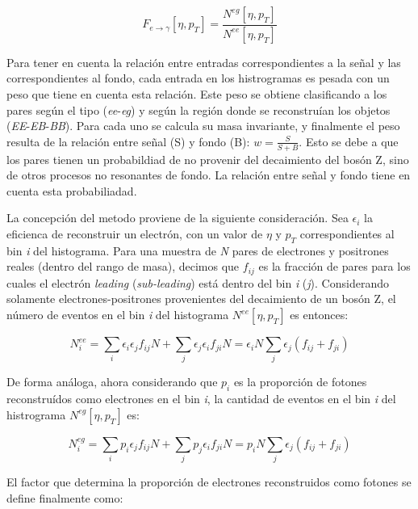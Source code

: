 \begin{equation}
F_{e\rightarrow\gamma}[\eta , p_{T}]=\frac{N^{eg}[\eta , p_{T}]}{N^{ee}[\eta , p_{T}]}
\end{equation}

Para tener en cuenta la relación entre entradas correspondientes a la señal y las correspondientes al fondo, cada entrada en los histrogramas es pesada con un peso que tiene en cuenta esta relación. Este peso se obtiene clasificando a los pares según el tipo (\textit{ee}-\textit{eg}) y según la región donde se reconstruían los objetos (\textit{EE}-\textit{EB}-\textit{BB}). Para cada uno se calcula su masa invariante, y finalmente el peso resulta de la relación entre señal (S) y fondo (B): $w=\frac{S}{S+B}$. Esto se debe a que los pares tienen un probabildiad de no provenir del decaimiento del bosón Z, sino de otros procesos no resonantes de fondo. La relación entre señal y fondo tiene en cuenta esta probabiliadad.

La concepción del metodo proviene de la siguiente consideración. Sea $\epsilon_{i}$ la eficienca de reconstruir un electrón, con un valor de $\eta$ y $p_{T}$ correspondientes al bin \textit{i} del histograma. Para una muestra de \textit{N} pares de electrones y positrones reales (dentro del rango de masa), decimos que $f_{ij}$ es la fracción de pares para los cuales el electrón \textit{leading} (\textit{sub-leading}) está dentro del bin \textit{i} (\textit{j}). Considerando solamente electrones-positrones provenientes del decaimiento de un bosón Z, el número de eventos en el bin \textit{i} del histograma $N^{ee}[\eta , p_{T}]$ es entonces:

\begin{equation}
N_{i}^{ee} = \sum_{i}\epsilon_{i}\epsilon_{j}f_{ij}N + \sum_{j}\epsilon_{j}\epsilon_{i}f_{ji}N = \epsilon_{i}N\sum_{j}\epsilon_{j}(f_{ij}+f_{ji})
\end{equation}

De forma análoga, ahora considerando que $p_{i}$ es la proporción de fotones reconstruídos como electrones en el bin \textit{i}, la cantidad de eventos en el bin \textit{i} del histrograma $N^{eg}[\eta , p_{T}]$ es:

\begin{equation}
N_{i}^{eg} = \sum_{i}p_{i}\epsilon_{j}f_{ij}N + \sum_{j}p_{j}\epsilon_{i}f_{ji}N = p_{i}N\sum_{j}\epsilon_{j}(f_{ij}+f_{ji})
\end{equation}

El factor que determina la proporción de electrones reconstruidos como fotones se define finalmente como:


